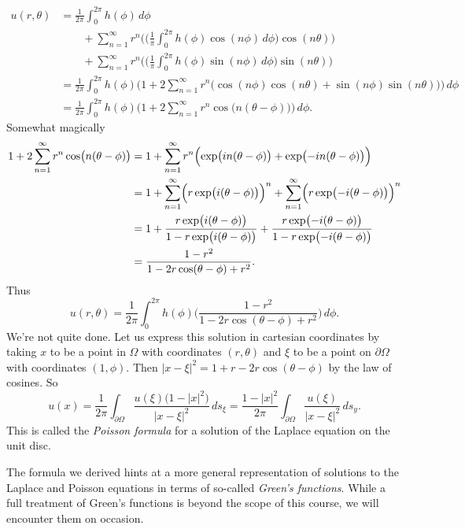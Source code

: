 \begin{example}
\begin{align*}
u(r,\theta) &= \frac{1}{2\pi} \int_0^{2\pi} h(\phi)\,d\phi \\
	&\qquad + \sum_{n = 1}^\infty r^n\Biggl(\biggl(\frac{1}{\pi} \int_0^{2\pi} h(\phi) \cos(n\phi)\,d\phi\biggr) \cos(n\theta)\Biggr) \\ &\qquad + \sum_{n = 1}^\infty r^n\Biggl(\biggl(\frac{1}{\pi} \int_0^{2\pi} h(\phi) \sin(n\phi)\,d\phi\biggr) \sin(n\theta)\Biggr) \\
	&= \frac{1}{2\pi} \int_0^{2\pi} h(\phi) \Biggl(1 + 2\sum_{n = 1}^\infty r^n \bigl(\cos(n\phi)\cos(n\theta) + \sin(n\phi)\sin(n\theta)\bigr)\Biggr)\,d\phi\\
	&= \frac{1}{2\pi} \int_0^{2\pi} h(\phi) \Biggl(1 + 2\sum_{n = 1}^\infty r^n \cos\bigl(n(\theta-\phi)\bigr)\Biggr)\,d\phi .
\end{align*}
Somewhat magically
\begin{align*}
1+2\sum_{n = 1}^\infty r^n \cos\bigl(n(\theta-\phi)\bigr) &= 1 + \sum_{n = 1}^\infty r^n \Bigl(\exp\bigl(in(\theta-\phi)\bigr) + \exp\bigl(-in(\theta-\phi)\bigr)\Bigr) \\
	&= 1 + \sum_{n = 1}^\infty \Bigl(r \exp\bigl(i(\theta-\phi)\bigr)\Bigr)^n + \sum_{n = 1}^\infty \Bigl(r \exp\bigl(-i(\theta-\phi)\bigr)\Bigr)^n \\
	&= 1 + \frac{r \exp\bigl(i(\theta-\phi)\bigr)}{1-r\exp\bigl(i(\theta-\phi)\bigr)} + \frac{r \exp\bigl(-i(\theta-\phi)\bigr)}{1-r\exp\bigl(-i(\theta-\phi)\bigr)} \\
	&= \frac{1-r^2}{1-2r\cos(\theta-\phi)+r^2}.
\end{align*}
Thus
\[u(r,\theta) = \frac{1}{2\pi} \int_0^{2\pi} h(\phi)\biggl(\frac{1-r^2}{1-2r\cos(\theta-\phi)+r^2}\biggr)\,d\phi. \]
We're not quite done. Let us express this solution in cartesian coordinates by taking $x$ to be a point in $\Omega$ with coordinates $(r,\theta)$ and $\xi$ to be a point on $\partial \Omega$ with coordinates $(1,\phi)$. Then $|x-\xi|^2 = 1 + r - 2r\cos(\theta-\phi)$ by the law of cosines. So
\[u(x) = \frac{1}{2\pi}\int_{\partial\Omega} \frac{u(\xi)\bigl(1-|x|^2\bigr)}{|x-\xi|^2}\,ds_\xi = \frac{1-|x|^2}{2\pi}\int_{\partial\Omega} \frac{u(\xi)}{|x-\xi|^2}\,ds_y.\]
This is called the \emph{Poisson formula} for a solution of the Laplace equation on the unit disc.
\end{example}

\begin{remark}
The formula we derived hints at a more general representation of solutions to the Laplace and Poisson equations in terms of so-called \emph{Green's functions}. While a full treatment of Green's functions is beyond the scope of this course, we will encounter them on occasion.
\end{remark}

